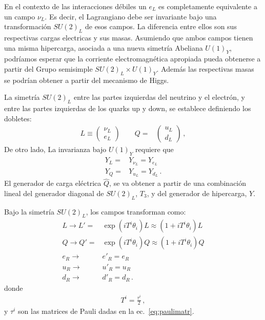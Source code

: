 \begin{frame}
En el contexto de las interacciones débiles un $e_L$ es completamente equivalente a un campo $\nu_L$. Es decir, el Lagrangiano debe ser invariante bajo una transformación $SU(2)_L$ de esos campos. La diferencia entre ellos son sus respectivas cargas electricas y sus masas. Asumiendo que ambos campos tienen una misma hipercarga, asociada a una nueva simetría Abeliana $U(1)_Y$, podríamos esperar que la corriente electromagnética apropiada pueda obtenerse a partir del Grupo semisimple $SU(2)_L\times  U(1)_Y$. Además las respectivas masas se podrían obtener a partir del mecanismo de Higgs. 

La simetría $SU(2)_L$ entre las partes izquierdas del neutrino y el electrón, y entre las partes izquierdas de los quarks up y down, se establece  definiendo los dobletes:
  \begin{align}
    L\equiv\begin{pmatrix}
      \nu_L\\
      e_L      
    \end{pmatrix}\qquad   Q=&\begin{pmatrix}
    u_L\\
    d_L
  \end{pmatrix}\,,
  \end{align}
De otro lado, La invarianza bajo $U(1)_Y$ requiere que
\begin{align}
  Y_L=&Y_{\nu_L}=Y_{e_L}\nonumber\\
  Y_Q=&Y_{u_L}=Y_{d_L}\,.
\end{align}
El generador de carga eléctrica $\widehat{Q}$, se va obtener a partir de una combinación lineal del generador diagonal de $SU(2)_L$, $T_3$, y del generador de hipercarga, $Y$.

Bajo la simetría $SU(2)_L$, los campos transforman como:
 \begin{align}
  L\to L'=&\exp(i T^i \theta_i)L\approx(1+i T^i\theta_i)L\nonumber\\
  Q\to Q'=&\exp(i T^i \theta_i)Q\approx(1+i T^i\theta_i)Q\nonumber\\
  e_R\to& e'_R=e_R\nonumber\\
  u_R\to& u'_R=u_R\nonumber\\
  d_R\to& d'_R=d_R\,.
\end{align}
donde
\begin{align}
  T^i=\frac{\tau^i}{2}\,,
\end{align}
y $\tau^i$ son las matrices de Pauli dadas en la ec.~\eqref{eq:paulimatr}.


\end{frame}
